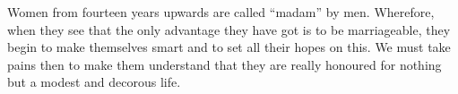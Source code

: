 Women from fourteen years upwards are  called ``madam'' by men. Wherefore, when
they see  that the  only advantage they  have got is  to be  marriageable, they
begin to make themselves smart and to set all their hopes on this. We must take
pains then  to make them understand  that they are really  honoured for nothing
but a modest and decorous life.
